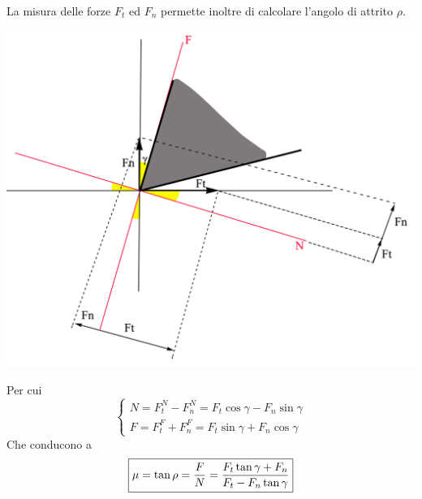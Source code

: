 \documentclass[a4paper, 15pt]{article}
\begin{document}
	La misura delle forze $F_t$ ed $F_n$ permette inoltre di calcolare l'angolo di
	attrito $\rho$.
	\begin{center}
		\includegraphics[width=0.5\linewidth]{figures/asp19}
	\end{center}
 	Per cui 
 	\[\begin{cases}
 		N = F_t^N-F_n^N = F_t\cos\gamma-F_n\sin\gamma\\
 		F = F_t^F+F_n^F = F_t\sin\gamma + F_n\cos\gamma
 	\end{cases}\]
	Che conducono a
	\begin{equation}\label{eq:20}
		\boxed{\mu = \tan\rho = {F\over N} = \dfrac{F_t\tan\gamma+F_n}{F_t-F_n\tan\gamma}}
	\end{equation}
\newpage
\end{document}
